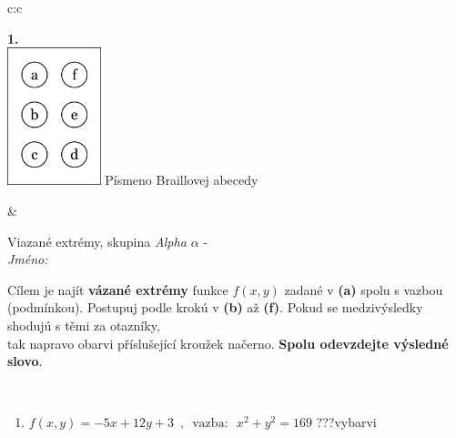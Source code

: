 \documentclass[10pt]{report}
\begin{document}
\begin{tabular}{c:c}
\begin{minipage}[c][104.5mm][t]{0.5\linewidth}
\begin{center}
\begin{minipage}{0.79\linewidth}
\begin{center}
\begin{varwidth}{\linewidth}
\begin{enumerate}
\end{enumerate}
\end{varwidth}
\end{center}
\end{minipage}
\begin{minipage}{0.20\linewidth}
\begin{center}
{\Huge\bfseries 1.} \\[2mm]
\includegraphics[height=40mm]{../images/braille.png}
{\small Písmeno Braillovej abecedy}
\end{center}
\end{minipage}
\end{center}
\end{minipage}
&
\begin{minipage}[c][104.5mm][t]{0.5\linewidth}
\begin{center}
\vspace{7mm}
{\huge Viazané extrémy, skupina \textit{Alpha $\alpha$} -}\\[5mm]
\textit{Jméno:}\phantom{xxxxxxxxxxxxxxxxxxxxxxxxxxxxxxxxxxxxxxxxxxxxxxxxxxxxxxxxxxxxxxxxx}\\[5mm]
\begin{minipage}{0.95\linewidth}
\begin{center}
Cílem je najít \textbf{vázané extrémy} funkce $f(x,y)$ zadané v \textbf{(a)} spolu s vazbou (podmínkou). Postupuj podle krokú v \textbf{(b)} až \textbf{(f)}. Pokud se medzivýsledky shodujú s těmi za otazníky,\\tak napravo obarvi příslušející kroužek načerno. \textbf{Spolu odevzdejte výsledné slovo}.
\end{center}
\end{minipage}
\\[1mm]
\begin{minipage}{0.79\linewidth}
\begin{center}
\begin{varwidth}{\linewidth}
\begin{enumerate}
\normalsize
\item $f(x,y)=-5x+12y+3 \enspace , \enspace \mathrm{vazba:} \enspace x^2+y^2=169$\quad \dotfill\; ???\;\dotfill \quad vybarvi

\end{enumerate}
\end{varwidth}
\end{center}
\end{minipage}
\end{center}
\end{minipage}
\end{tabular}
\end{document}

